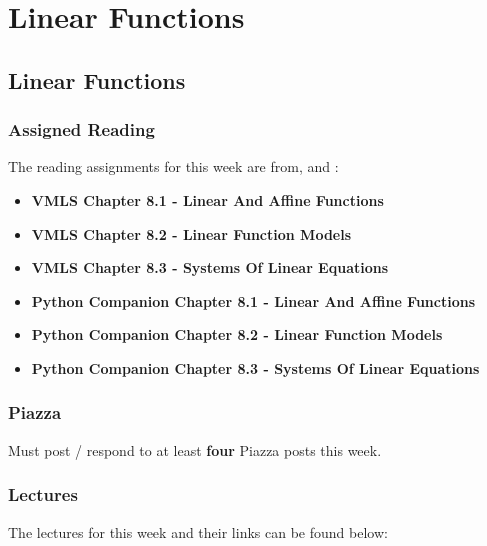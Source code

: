 \clearpage

\renewcommand{\ChapTitle}{Linear Functions}
\renewcommand{\SectionTitle}{Linear Functions}

\chapter{\ChapTitle}
\section{\SectionTitle}

\subsection{Assigned Reading}

The reading assignments for this week are from, \VMLS \hspace*{1pt} and \PyCap:

\begin{itemize}
    \item \textbf{VMLS Chapter 8.1 - Linear And Affine Functions}
    \item \textbf{VMLS Chapter 8.2 - Linear Function Models}
    \item \textbf{VMLS Chapter 8.3 - Systems Of Linear Equations}
    \item \textbf{Python Companion Chapter 8.1 - Linear And Affine Functions}
    \item \textbf{Python Companion Chapter 8.2 - Linear Function Models}
    \item \textbf{Python Companion Chapter 8.3 - Systems Of Linear Equations}
\end{itemize}

\subsection{Piazza}

Must post / respond to at least \textbf{four} Piazza posts this week.

\subsection{Lectures}

The lectures for this week and their links can be found below:

